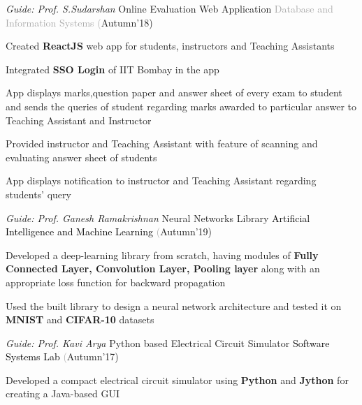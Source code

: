 \begin{cventries}
  \cventry
    {\textit{Guide: Prof. S.Sudarshan}}
    {Online Evaluation Web Application}
    {\textcolor{darkgray} {Database and Information Systems}}
    {\fontsize{9pt}{1em} \textcolor{darkgray}(Autumn'18)}
    {
      \begin{cvitems}
        \item Created \textbf{ReactJS} web app for students, instructors and Teaching Assistants \vspace{0.3mm}
        \item Integrated \textbf{SSO Login} of IIT Bombay in the app \vspace{0.3mm}
        \item App displays marks,question paper and answer sheet of every exam to student and sends the queries of student regarding marks awarded to particular answer to Teaching Assistant and Instructor \vspace{0.3mm}
        \item Provided instructor and Teaching Assistant with feature of scanning and evaluating answer sheet of students \vspace{0.3mm}
        \item App displays notification to instructor and Teaching Assistant regarding students' query
      \end{cvitems}
    }
  \cventry
    {\textit{Guide: Prof. Ganesh Ramakrishnan}}
    {Neural Networks Library}
    {\textcolor{black} {Artificial Intelligence and Machine Learning}}
    {\fontsize{9pt}{1em} \textcolor{darkgray}(Autumn'19)}
    {
      \begin{cvitems}
        \item Developed a deep-learning library from scratch, having modules of \textbf{Fully Connected Layer, Convolution Layer,
        Pooling layer} along with an appropriate loss function for backward propagation\vspace{0.3mm}
        \item Used the built library to design a neural network architecture and tested it on \textbf{MNIST} and \textbf{CIFAR-10} datasets
      \end{cvitems}
    }
  \cventry
    {\textit{Guide: Prof. Kavi Arya}}
    {Python based Electrical Circuit Simulator}
    {\textcolor{black} {Software Systems Lab}}
    {\fontsize{9pt}{1em} \textcolor{darkgray}(Autumn'17)}
    {
      \begin{cvitems}
        \item Developed a compact electrical circuit simulator using \textbf{Python} and \textbf{Jython} for creating a Java-based GUI \vspace{0.3mm}

\end{cvitems}}
\end{cventries}
